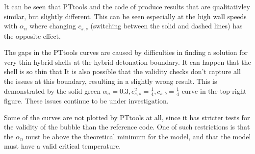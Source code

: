 It can be seen that PTtools and the code of \cite{giese_2021} produce results that are qualitativley similar, but slightly different.
This can be seen especially at the high wall speeds with $\alpha_n$ where changing $c_{s,s}$ (switching between the solid and dashed lines) has the opposite effect.

The gaps in the PTtools curves are caused by difficulties in finding a solution for very thin hybrid shells at the hybrid-detonation boundary.
It can happen that the shell is so thin that
It is also possible that the validity checks don't capture all the issues at this boundary,
resulting in a slightly wrong result.
This is demonstrated by the solid green $\alpha_n = 0.3, c_{s,s}^2 = \frac{1}{4}, c_{s,b} = \frac{1}{4}$ curve in the top-right figure.
These issues continue to be under investigation.

Some of the curves are not plotted by PTtools at all, since it has stricter tests for the validity of the bubble than the reference code.
One of such restrictions is that the $\alpha_n$ must be above the theoretical minimum for the model,
and that the model must have a valid critical temperature.
